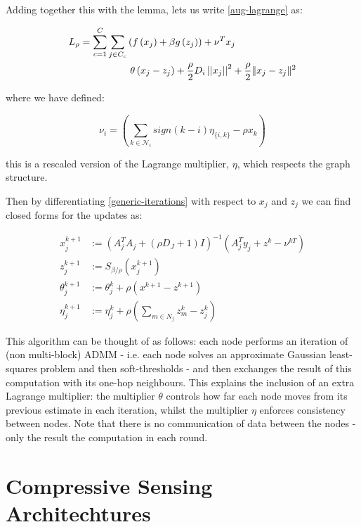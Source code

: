 \documentclass{article}
\begin{document}
Adding together this with the lemma, lets us write \eqref{aug-lagrange} as:

\begin{align}
L_\rho = \sum_{c=1}^C\sum_{j \in C_c} &\left( f\left(x_j\right) + \beta g\left(z_j\right)\right) + \nu^Tx_j \nonumber \\
& \text{        } \theta\left(x_j - z_j\right) + \frac{\rho}{2}D_i\left|\left|x_j\right|\right|^2 + \frac{\rho }{2}\|x_j-z_j\|^2
\label{generic-iterations}
\end{align}

where we have defined:

\begin{equation}
\nu_i = \left(\sum_{k \in \mathcal{N}_i} sign\left(k-i\right)\eta_{\{i,k\}} - \rho x_k \right)
\end{equation}

this is a rescaled version of the Lagrange multiplier, \(\eta\), which respects the graph structure. 

Then by differentiating \eqref{generic-iterations} with respect to \(x_j\) and \(z_j\) we  can find closed forms for the updates as:

\begin{thm}
\begin{align}
x_j^{k+1} &:= \left(A_j^TA_j + (\rho D_J + 1) I\right)^{-1}\left(A_j^Ty_j +  z^k - \nu^{kT}\right)\\
z_j^{k+1} &:= S_{\beta/\rho}\left(x_j^{k+1} \right)
 \\
\theta_j^{k+1} &:= \theta_j^{k} + \rho \left(x^{k+1}-z^{k+1}\right) \\
\eta_j^{k+1} &:= \eta_j^k + \rho\left(\sum_{m \in N_j} z_m^k - z_j^k\right)
\label{dadmm_algo_lasso}
\end{align}
\end{thm}

This algorithm can be thought of as follows: each node performs an iteration of (non multi-block) ADMM - i.e. each node solves an approximate Gaussian least-squares problem and then soft-thresholds - and then exchanges the result of this computation with its one-hop neighbours. This explains the inclusion of an extra Lagrange multiplier: the multiplier \(\theta\) controls how far each node moves from its previous estimate in each iteration, whilst the multiplier \(\eta\) enforces consistency between nodes. Note that there is no communication of data between the nodes - only the result the computation in each round.

\section{Compressive Sensing Architechtures}\label{sec:sensingmodel}
\end{document}
